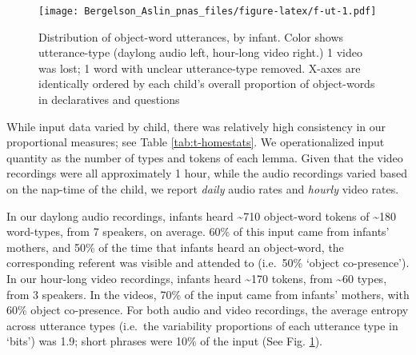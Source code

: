 \documentclass[9pt,twocolumn,twoside,]{pnas-new}
\begin{document}
\begin{figure}[htbp]
\centering
\texttt{[image: Bergelson\_Aslin\_pnas\_files/figure-latex/f-ut-1.pdf]}
\caption{\label{fig:f-ut}Distribution of object-word utterances, by
infant. Color shows utterance-type (daylong audio left, hour-long video
right.) 1 video was lost; 1 word with unclear utterance-type removed.
X-axes are identically ordered by each child's overall proportion of
object-words in declaratives and questions}
\end{figure}

While input data varied by child, there was relatively high consistency
in our proportional measures; see Table \ref{tab:t-homestats}. We
operationalized input quantity as the number of types and tokens of each
lemma. Given that the video recordings were all approximately 1 hour,
while the audio recordings varied based on the nap-time of the child, we
report \emph{daily} audio rates and \emph{hourly} video rates.

In our daylong audio recordings, infants heard \textasciitilde{}710
object-word tokens of \textasciitilde{}180 word-types, from 7 speakers,
on average. 60\% of this input came from infants' mothers, and 50\% of
the time that infants heard an object-word, the corresponding referent
was visible and attended to (i.e.~50\% `object co-presence'). In our
hour-long video recordings, infants heard \textasciitilde{}170 tokens,
from \textasciitilde{}60 types, from 3 speakers. In the videos, 70\% of
the input came from infants' mothers, with 60\% object co-presence. For
both audio and video recordings, the average entropy across utterance
types (i.e.~the variability proportions of each utterance type in
`bits') was 1.9; short phrases were 10\% of the input (See Fig.
\ref{fig:f-ut}).

\begin{table}[!th]

\caption{\label{tab:t-homestats}Home Recording Descriptive Statistics: Range, Mean(SD)}
\centering
{}
\end{table}
\end{document}
